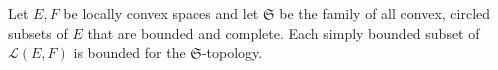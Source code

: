 Let \(E, F\) be locally convex spaces and let \(\mathfrak{S}\) be the family of all convex, circled subsets of \(E\) that are bounded and complete. Each simply bounded subset of \(\mathcal{L}(E, F)\) is bounded for the \(\mathfrak{S}\)-topology.
